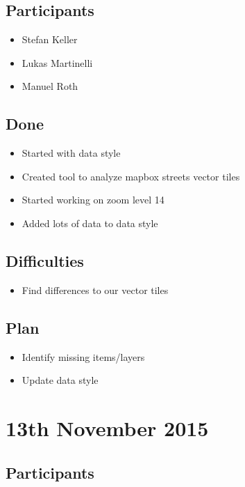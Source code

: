 \subsection*{Participants}

\begin{itemize}
  \item Stefan Keller
  \item Lukas Martinelli
  \item Manuel Roth
\end{itemize}

\subsection*{Done}

\begin{itemize}
  \item Started with data style
  \item Created tool to analyze mapbox streets vector tiles
  \item Started working on zoom level 14
  \item Added lots of data to data style
\end{itemize}

\subsection*{Difficulties}

\begin{itemize}
  \item Find differences to our vector tiles
\end{itemize}

\subsection*{Plan}

\begin{itemize}
  \item Identify missing items/layers
  \item Update data style
\end{itemize}


\section*{13th November 2015}

\subsection*{Participants}

